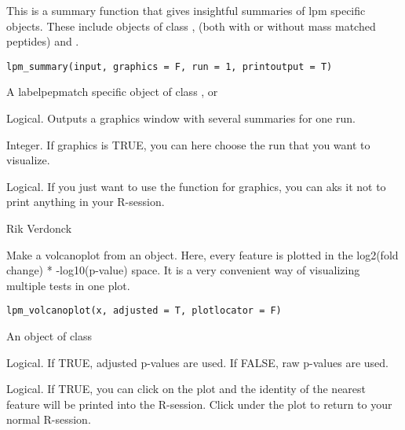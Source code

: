 \documentclass[letterpaper]{book}
\begin{document}
%
\begin{Description}\relax
This is a summary function that gives insightful summaries of lpm specific objects. These include objects of class ,  (both with or without mass matched peptides) and .
\end{Description}
%
\begin{Usage}
\begin{verbatim}
lpm_summary(input, graphics = F, run = 1, printoutput = T)
\end{verbatim}
\end{Usage}
%
\begin{Arguments}
\begin{ldescription}
\item[\code{input}] A labelpepmatch specific object of class ,  or 

\item[\code{graphics}] Logical. Outputs a graphics window with several summaries for one run.

\item[\code{run}] Integer. If graphics is TRUE, you can here choose the run that you want to visualize.

\item[\code{printoutput}] Logical. If you just want to use the function for graphics, you can aks it not to print anything in your R-session.
\end{ldescription}
\end{Arguments}
%
\begin{Author}\relax
Rik Verdonck
\end{Author}
%
\begin{Description}\relax
Make a volcanoplot from an  object. Here, every feature is plotted in the log2(fold change) * -log10(p-value) space. It is a very convenient way of visualizing multiple tests in one plot.
\end{Description}
%
\begin{Usage}
\begin{verbatim}
lpm_volcanoplot(x, adjusted = T, plotlocator = F)
\end{verbatim}
\end{Usage}
%
\begin{Arguments}
\begin{ldescription}
\item[\code{x}] An object of class 

\item[\code{adjusted}] Logical. If TRUE, adjusted p-values are used. If FALSE, raw p-values are used.

\item[\code{plotlocator}] Logical. If TRUE, you can click on the plot and the identity of the nearest feature will be printed into the R-session. Click under the plot to return to your normal R-session.
\end{ldescription}
\end{Arguments}
\end{document}
